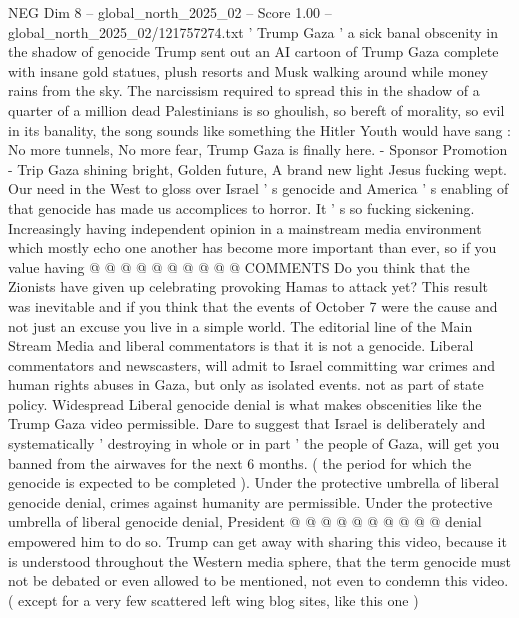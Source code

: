 \begin{textsample}{NEG Dim 8 – global\_north\_2025\_02 – Score 1.00 – global\_north\_2025\_02/121757274.txt}  \label{ex:f8_neg_435}
' Trump Gaza ' a sick banal obscenity in the shadow of genocide Trump sent out an AI cartoon of Trump Gaza complete with insane gold statues, plush resorts and Musk walking around while money rains from the sky.
The narcissism required to spread this in the shadow of a quarter of a million dead Palestinians is so ghoulish, so bereft of morality, so evil in its banality, the song sounds like something the Hitler Youth would have sang : No more tunnels, No more fear, Trump Gaza is finally here. - Sponsor Promotion - Trip Gaza shining bright, Golden future, A brand new light Jesus fucking wept.
Our need in the West to gloss over Israel ' s genocide and America ' s enabling of that genocide has made us accomplices to horror.
It ' s so fucking sickening.
Increasingly having independent opinion in a mainstream media environment which mostly echo one another has become more important than ever, so if you value having @ @ @ @ @ @ @ @ @ @ COMMENTS Do you think that the Zionists have given up celebrating provoking Hamas to attack yet?
This result was inevitable and if you think that the events of October 7 were the cause and not just an excuse you live in a simple world.
The editorial line of the Main Stream Media and liberal commentators is that it is not a genocide.
Liberal commentators and newscasters, will admit to Israel committing war crimes and human rights abuses in Gaza, but only as isolated events. not as part of state policy.
Widespread Liberal genocide denial is what makes obscenities like the Trump Gaza video permissible.
Dare to suggest that Israel is deliberately and systematically ' destroying in whole or in part ' the people of Gaza, will get you banned from the airwaves for the next 6 months. ( the period for which the genocide is expected to be completed ).
Under the protective umbrella of liberal genocide denial, crimes against humanity are permissible.
Under the protective umbrella of liberal genocide denial, President @ @ @ @ @ @ @ @ @ @ denial empowered him to do so.
Trump can get away with sharing this video, because it is understood throughout the Western media sphere, that the term genocide must not be debated or even allowed to be mentioned, not even to condemn this video. ( except for a very few scattered left wing blog sites, like this one )

\end{textsample}
